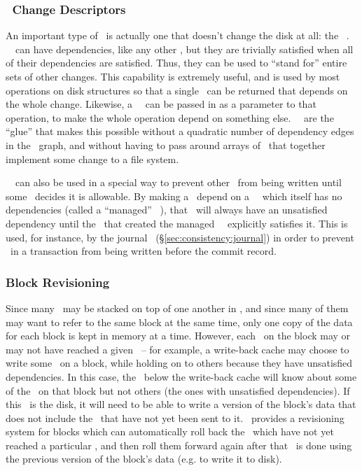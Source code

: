 \subsubsection{\Noop\ Change Descriptors}
\label{sec:design:chdescs:noop}
An important type of \chdesc\ is actually one that doesn't change the disk at
all: the \noop\ \chdesc. \Noop\ \chdescs\ can have dependencies, like any other
\chdesc, but they are trivially satisfied when all of their dependencies are
satisfied. Thus, they can be used to ``stand for'' entire sets of other changes.
This capability is extremely useful, and is used by most operations on disk
structures so that a single \chdesc\ can be returned that depends on the whole
change. Likewise, a \noop\ \chdesc\ can be passed in as a parameter to that
operation, to make the whole operation depend on something else. \Noop\
\chdescs\ are the ``glue'' that makes this possible without a quadratic number
of dependency edges in the \chdesc\ graph, and without having to pass around
arrays of \chdescs\ that together implement some change to a file system.

\Noop\ \chdescs\ can also be used in a special way to prevent other \chdescs\
from being written until some \module\ decides it is allowable. By making a
\chdesc\ depend on a \noop\ \chdesc\ which itself has no dependencies (called a
``managed'' \noop\ \chdesc), that \chdesc\ will always have an unsatisfied
dependency until the \module\ that created the managed \noop\ \chdesc\
explicitly satisfies it. This is used, for instance, by the journal \module\
(\S\ref{sec:consistency:journal}) in order to prevent \chdescs\ in a transaction
from being written before the commit record.

\subsubsection{Block Revisioning}
Since many \modules\ may be stacked on top of one another in \Kudos, and since
many of them may want to refer to the same block at the same time, only one copy
of the data for each block is kept in memory at a time. However, each \chdesc\
on the block may or may not have reached a given \module\ -- for example, a
write-back cache may choose to write some \chdescs\ on a block, while holding on
to others because they have unsatisfied dependencies. In this case, the \module\
below the write-back cache will know about some of the \chdescs\ on that block
but not others (the ones with unsatisfied dependencies). If this \module\ is the
disk, it will need to be able to write a version of the block's data that does
not include the \chdescs\ that have not yet been sent to it. \Kudos\ provides a
revisioning system for blocks which can automatically roll back the \chdescs\
which have not yet reached a particular \module, and then roll them forward
again after that \module\ is done using the previous version of the block's data
(e.g. to write it to disk).

